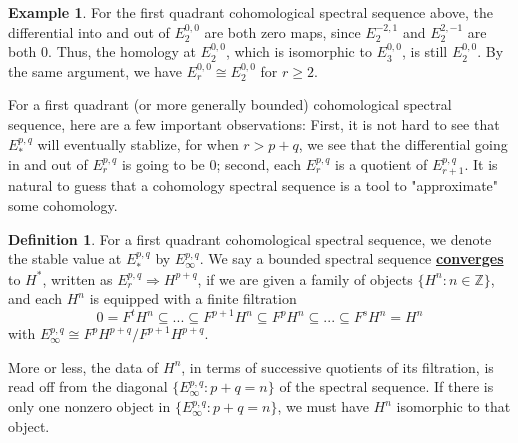 \documentclass{article}
\theoremstyle{definition}
\theoremstyle{definition}
\theoremstyle{definition}
\theoremstyle{definition}
\newtheorem{definition}{Definition}[theorem]
\theoremstyle{definition}
\theoremstyle{definition}
\newtheorem{example}{Example}[theorem]
\begin{document}
\begin{tcolorbox}[colback=yellow!5!white,colframe=yellow!30!white]
\begin{example}
	For the first quadrant cohomological spectral sequence above, the differential into and out of $E_2^{0,0}$ are both zero maps, since $E_2^{-2,1}$ and $E_2^{2,-1}$ are both $0$. Thus, the homology at $E_2^{0,0}$, which is isomorphic to $E_3^{0,0}$, is still $E_2^{0,0}$. By the same argument, we have $E_r^{0,0}\cong E_2^{0,0}$ for $r\geq 2$. 
\end{example}
\end{tcolorbox}


For a first quadrant (or more generally bounded) cohomological spectral sequence, here are a few important observations: First, it is not hard to see that $E_*^{p,q}$ will eventually stablize, for when $r>{p+q}$, we see that the differential going in and out of $E_r^{p,q}$ is going to be $0$; second, each $E_r^{p,q}$ is a quotient of $E_{r+1}^{p,q}$. It is natural to guess that a cohomology spectral sequence is a tool to "approximate" some cohomology. 


\begin{tcolorbox}[colback=purple!5!white,colframe=purple!75!black]
\begin{definition}
For a first quadrant cohomological spectral sequence, we denote the stable value at $E_*^{p,q}$ by $E_{\infty}^{p,q}$. We say a bounded spectral sequence \underline{\textbf{converges}} to $H^*$, written as $E_r^{p,q}\Longrightarrow H^{p+q}$, if we are given a family of objects $\{H^n: n\in \mathbb{Z}\}$, and each $H^n$ is equipped with a finite filtration
\[
0=F^tH^n\subseteq ...\subseteq F^{p+1}H^n\subseteq F^pH^n\subseteq ...\subseteq F^sH^n=H^n
\] 
with $E^{p,q}_{\infty}\cong F^pH^{p+q}/F^{p+1}H^{p+q}$. 
\end{definition}
\end{tcolorbox}
More or less, the data of $H^n$, in terms of successive quotients of its filtration, is read off from the diagonal $\{E_{\infty}^{p,q}: p+q=n\}$ of the spectral sequence. If there is only one nonzero object in $\{E_{\infty}^{p,q}: p+q=n\}$, we must have $H^n$ isomorphic to that object. 
\end{document}
